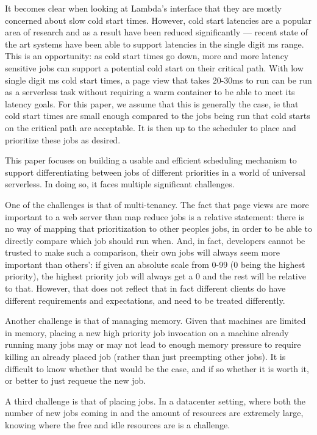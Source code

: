 It becomes clear when looking at Lambda's interface that they are mostly
concerned about slow cold start times. However, cold start latencies are a
popular area of research and as a result have been reduced significantly ---
recent state of the art systems have been able to support latencies in the
single digit ms range\cite{TODO}. This is an opportunity: as cold start times go
down, more and more latency sensitive jobs can support a potential cold start on
their critical path. With low single digit ms cold start times, a page view that
takes 20-30ms to run can be run as a serverless task without requiring a warm
container to be able to meet its latency goals. For this paper, we assume that
this is generally the case, ie that cold start times are small enough compared
to the jobs being run that cold starts on the critical path are acceptable. It
is then up to the scheduler to place and prioritize these jobs as desired.


This paper focuses on building a usable and efficient scheduling mechanism to
support differentiating between jobs of different priorities in a world of
universal serverless. In doing so, it faces multiple significant challenges.

One of the challenges is that of multi-tenancy. The fact that page views are
more important to a web server than map reduce jobs is a relative statement:
there is no way of mapping that prioritization to other peoples jobs, in order
to be able to directly compare which job should run when. And, in fact,
developers cannot be trusted to make such a comparison, their own jobs will
always seem more important than others': if given an absolute scale from 0-99 (0
being the highest priority), the highest priority job will always get a 0 and
the rest will be relative to that. However, that does not reflect that in fact
different clients do have different requirements and expectations, and need
to be treated differently.

Another challenge is that of managing memory. Given that machines are limited in
memory, placing a new high priority job invocation on a machine already running
many jobs may or may not lead to enough memory pressure to require killing an
already placed job (rather than just preempting other jobs). It is difficult to
know whether that would be the case, and if so whether it is worth it, or better
to just requeue the new job.

A third challenge is that of placing jobs. In a datacenter setting, where both
the number of new jobs coming in and the amount of resources are extremely
large, knowing where the free and idle resources are is a challenge. 

